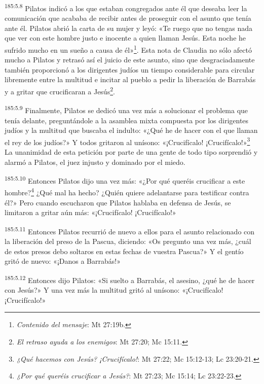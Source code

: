 \par
\textsuperscript{185:5.8} Pilatos indicó a los que estaban congregados ante él que deseaba leer la comunicación que acababa de recibir antes de proseguir con el asunto que tenía ante él. Pilatos abrió la carta de su mujer y leyó: «Te ruego que no tengas nada que ver con este hombre justo e inocente a quien llaman Jesús. Esta noche he sufrido mucho en un sueño a causa de él»\footnote{\textit{Contenido del mensaje}: Mt 27:19b.}. Esta nota de Claudia no sólo afectó mucho a Pilatos y retrasó así el juicio de este asunto, sino que desgraciadamente también proporcionó a los dirigentes judíos un tiempo considerable para circular libremente entre la multitud e incitar al pueblo a pedir la liberación de Barrabás y a gritar que crucificaran a Jesús\footnote{\textit{El retraso ayuda a los enemigos}: Mt 27:20; Mc 15:11.}.

\par
\textsuperscript{185:5.9} Finalmente, Pilatos se dedicó una vez más a solucionar el problema que tenía delante, preguntándole a la asamblea mixta compuesta por los dirigentes judíos y la multitud que buscaba el indulto: «¿Qué he de hacer con el que llaman el rey de los judíos?» Y todos gritaron al unísono: «¡Crucifícalo! ¡Crucifícalo!»\footnote{\textit{¿Qué hacemos con Jesús? ¡Crucifícalo!}: Mt 27:22; Mc 15:12-13; Lc 23:20-21.} La unanimidad de esta petición por parte de una gente de todo tipo sorprendió y alarmó a Pilatos, el juez injusto y dominado por el miedo.

\par
\textsuperscript{185:5.10} Entonces Pilatos dijo una vez más: «¿Por qué queréis crucificar a este hombre?\footnote{\textit{¿Por qué queréis crucificar a Jesús?}: Mt 27:23; Mc 15:14; Lc 23:22-23.} ¿Qué mal ha hecho? ¿Quién quiere adelantarse para testificar contra él?» Pero cuando escucharon que Pilatos hablaba en defensa de Jesús, se limitaron a gritar aún más: «¡Crucifícalo! ¡Crucifícalo!»

\par
\textsuperscript{185:5.11} Entonces Pilatos recurrió de nuevo a ellos para el asunto relacionado con la liberación del preso de la Pascua, diciendo: «Os pregunto una vez más, ¿cuál de estos presos debo soltaros en estas fechas de vuestra Pascua?» Y el gentío gritó de nuevo: «¡Danos a Barrabás!»

\par
\textsuperscript{185:5.12} Entonces dijo Pilatos: «Si suelto a Barrabás, el asesino, ¿qué he de hacer con Jesús?» Y una vez más la multitud gritó al unísono: «¡Crucifícalo! ¡Crucifícalo!»

